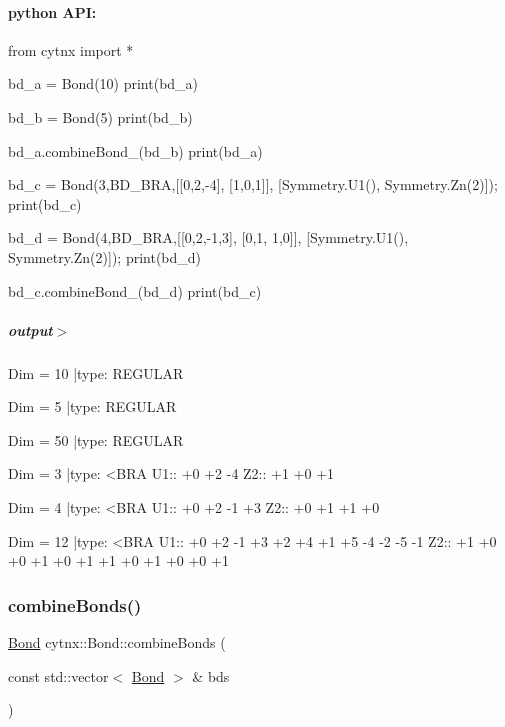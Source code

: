  \paragraph*{python A\+PI\+:}


\begin{DoxyCodeInclude}
\textcolor{keyword}{from} cytnx \textcolor{keyword}{import} *

bd\_a = Bond(10)
print(bd\_a)

bd\_b = Bond(5)
print(bd\_b)

bd\_a.combineBond\_(bd\_b)
print(bd\_a)


bd\_c = Bond(3,BD\_BRA,[[0,2,-4],
                      [1,0,1]],
                  [Symmetry.U1(),
                   Symmetry.Zn(2)]);
print(bd\_c)                                

bd\_d = Bond(4,BD\_BRA,[[0,2,-1,3],
                      [0,1, 1,0]],
                     [Symmetry.U1(),
                      Symmetry.Zn(2)]);
print(bd\_d)
    
bd\_c.combineBond\_(bd\_d)
print(bd\_c)

\end{DoxyCodeInclude}
 \subparagraph*{output$>$}


\begin{DoxyVerbInclude}
Dim = 10 |type: REGULAR 

Dim = 5 |type: REGULAR 

Dim = 50 |type: REGULAR 

Dim = 3 |type: <BRA     
 U1::  +0 +2 -4
 Z2::  +1 +0 +1

Dim = 4 |type: <BRA     
 U1::  +0 +2 -1 +3
 Z2::  +0 +1 +1 +0

Dim = 12 |type: <BRA     
 U1::  +0 +2 -1 +3 +2 +4 +1 +5 -4 -2 -5 -1
 Z2::  +1 +0 +0 +1 +0 +1 +1 +0 +1 +0 +0 +1







\end{DoxyVerbInclude}
 \mbox{\label{classcytnx_1_1Bond_a4a1d060cf2d0c44d83356df757a802d1}} 
\subsubsection{\texorpdfstring{combine\+Bonds()}{combineBonds()}}
{\footnotesize\ttfamily \hyperlink{classcytnx_1_1Bond}{Bond} cytnx\+::\+Bond\+::combine\+Bonds (\begin{DoxyParamCaption}\item[{const std\+::vector$<$ \hyperlink{classcytnx_1_1Bond}{Bond} $>$ \&}]{bds }\end{DoxyParamCaption})\hspace{0.3cm}{\ttfamily [inline]}}



